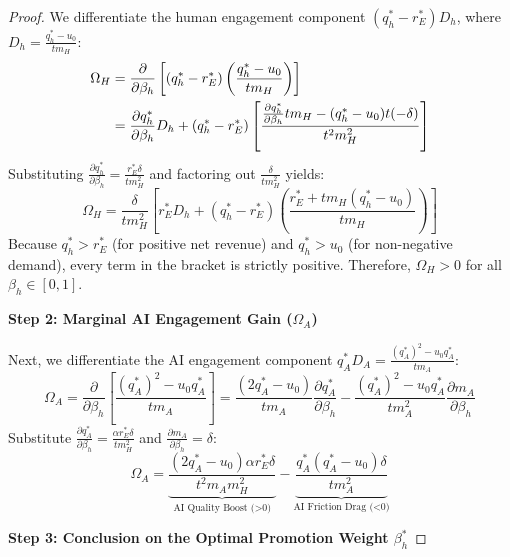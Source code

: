 \documentclass[mnsc,nonblindrev]{informs3_NoOR}
\begin{document}
\begin{proof}
We differentiate the human engagement component $(q_{h}^{*} - r_{E}^{*})D_{h}$, where $D_{h} = \frac{q_{h}^{*} - u_{0}}{tm_{H}}$:
\begin{align}
\Omega_{H} &= \frac{\partial}{\partial\beta_{h}} \left[ (q_{h}^{*} - r_{E}^{*}) \left( \frac{q_{h}^{*} - u_{0}}{tm_{H}} \right) \right] \notag \\
&  = \frac{\partial q_{h}^{*}}{\partial\beta_{h}} D_{h} + (q_{h}^{*} - r_{E}^{*}) \left[ \frac{\frac{\partial q_{h}^{*}}{\partial\beta_{h}} tm_{H} - (q_{h}^{*} - u_{0})t(-\delta)}{t^{2}m_{H}^{2}} \right]
\end{align}
Substituting $\frac{\partial q_{h}^{*}}{\partial\beta_{h}} = \frac{r_{E}^{*}\delta}{tm_{H}^{2}}$ and factoring out $\frac{\delta}{tm_{H}^{2}}$ yields:
\begin{equation}
\Omega_{H} = \frac{\delta}{tm_{H}^{2}} \left[ r_{E}^{*} D_{h} + (q_{h}^{*} - r_{E}^{*}) \left( \frac{r_{E}^{*} + tm_{H}(q_{h}^{*} - u_{0})}{tm_{H}} \right) \right]
\end{equation}
Because $q_{h}^{*} > r_{E}^{*}$ (for positive net revenue) and $q_{h}^{*} > u_{0}$ (for non-negative demand), every term in the bracket is strictly positive. Therefore, $\Omega_{H} > 0$ for all $\beta_{h} \in [0, 1]$.

\vspace{0.5cm}
\noindent \textbf{Step 2: Marginal AI Engagement Gain ($\Omega_{A}$)}

Next, we differentiate the AI engagement component $q_{A}^{*}D_{A} = \frac{(q_{A}^{*})^{2} - u_{0}q_{A}^{*}}{tm_{A}}$:
\begin{equation}
\Omega_{A} = \frac{\partial}{\partial\beta_{h}} \left[ \frac{(q_{A}^{*})^{2} - u_{0}q_{A}^{*}}{tm_{A}} \right] = \frac{(2q_{A}^{*} - u_{0})}{tm_{A}} \frac{\partial q_{A}^{*}}{\partial\beta_{h}} - \frac{(q_{A}^{*})^{2} - u_{0}q_{A}^{*}}{tm_{A}^{2}} \frac{\partial m_{A}}{\partial\beta_{h}}
\end{equation}
Substitute $\frac{\partial q_{A}^{*}}{\partial\beta_{h}} = \frac{\alpha r_{E}^{*}\delta}{tm_{H}^{2}}$ and $\frac{\partial m_{A}}{\partial\beta_{h}} = \delta$:
\begin{equation}
\Omega_{A} = \underbrace{\frac{(2q_{A}^{*} - u_{0}) \alpha r_{E}^{*} \delta}{t^{2}m_{A}m_{H}^{2}}}_{\text{AI Quality Boost (>0)}} - \underbrace{\frac{q_{A}^{*}(q_{A}^{*} - u_{0})\delta}{tm_{A}^{2}}}_{\text{AI Friction Drag (<0)}}
\end{equation}

\vspace{0.5cm}
\noindent \textbf{Step 3: Conclusion on the Optimal Promotion Weight $\beta_{h}^{*}$}



\end{proof}
\end{document}

